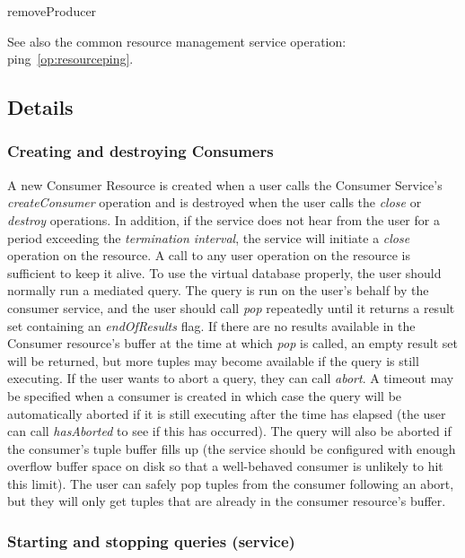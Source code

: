 \begin{method}{removeProducer}
\OK
\end{method}

See also the common resource management service operation:
ping~\ref{op:resourceping}.

\subsection{Details}
\subsubsection{Creating and destroying Consumers}\label{sec:ConsumerCreating}

A new Consumer Resource is created when a user calls the Consumer 
Service's \textit{createConsumer} operation and is destroyed when the user calls
the \textit{close} or \textit{destroy} operations. In addition, if the service does
not hear from the user for a period exceeding the \textit{termination interval},
the service will initiate a \textit{close} operation on the resource. A call to
any user operation on the resource is sufficient to keep it alive.
To use the virtual
database properly, the user should normally run a mediated query. The query is
run on the user's behalf by the consumer service, and the user should
call \textit{pop} repeatedly until it returns a result
set containing an \textit{endOfResults} flag. If
there are no results available in the Consumer resource's buffer at
the time at which \textit{pop} is called, an empty result set will be
returned, but more tuples may become available if the query is still
executing.  If the user wants to abort a query, they can call
\textit{abort}. A timeout may be specified when a consumer is created in which
case the query will
be automatically aborted if it is still executing after the time has elapsed
(the user can call \textit{hasAborted} to see if this has occurred). The query will also be aborted if the consumer's tuple
buffer fills up (the service should be configured with enough overflow buffer
space on disk so that a well-behaved consumer is unlikely to hit this
limit). The user can safely pop tuples from the consumer
following an abort, but they will only get tuples that are already in
the consumer resource's buffer. 

\subsubsection{Starting and stopping queries (service)}\label{sec:ConsumerStarting}

